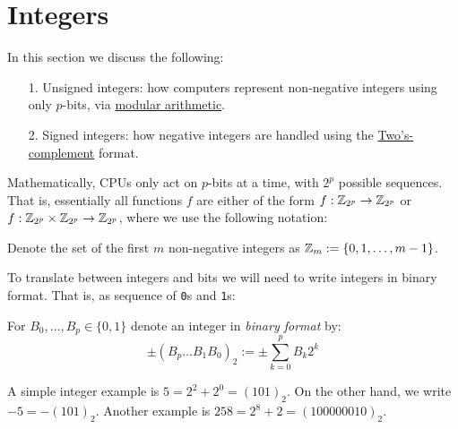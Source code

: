 
\section{Integers}
In this section we discuss the following:

\begin{itemize}
\item[1. ] Unsigned integers: how computers represent non-negative integers using only $p$-bits, via \href{https://en.wikipedia.org/wiki/Modular_arithmetic}{modular arithmetic}.


\item[2. ] Signed integers: how negative integers are handled using the \href{https://en.wikipedia.org/wiki/Two's_complement}{Two's-complement} format.

\end{itemize}
Mathematically, CPUs only act on $p$-bits at a time, with $2^p$ possible sequences. That is, essentially all functions $f$ are either of the form $f : {\mathbb Z}_{2^p} \rightarrow {\mathbb Z}_{2^p}$ or  $f : {\mathbb Z}_{2^p} \times {\mathbb Z}_{2^p} \rightarrow {\mathbb Z}_{2^p}$, where we use the following notation:

\begin{definition} Denote the set of the first $m$ non-negative integers as ${\mathbb Z}_m := \{0 , 1 , \ldots, m-1 \}$. \end{definition}

To translate between integers and bits we will need to write integers in binary format.  That is, as sequence of \texttt{0}s and \texttt{1}s:

\begin{definition} For $B_0,\ldots,B_p \in \{0,1\}$ denote an integer in \emph{binary format} by:
\[
\ensuremath{\pm}(B_p\ldots B_1B_0)_2 := \ensuremath{\pm}\sum_{k=0}^p B_k 2^k
\]
\end{definition}

\begin{example} A simple integer example is $5 = 2^2 + 2^0 = (101)_2$. On the other hand, we write $-5 = -(101)_2$. Another example is $258 = 2^8 + 2 = (100000010)_2$. \end{example}

